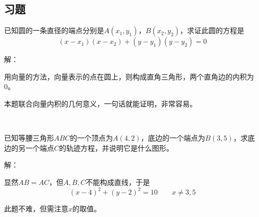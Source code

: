 \subsection{习题}

\begin{example}
已知圆的一条直径的端点分别是$A\left( x_1,y_1 \right) $，$B\left( x_2,y_2 \right) $，求证此圆的方程是
\[
\left( x-x_1 \right) \left( x-x_2 \right) +\left( y-y_1 \right) \left( y-y_2 \right) =0
\]
\end{example}

解：

用向量的方法，向量表示的点在圆上，则构成直角三角形，两个直角边的内积为0。

\begin{tcolorbox}
本题联合向量内积的几何意义，一句话就能证明，非常容易。
\end{tcolorbox}

~

\begin{example}
已知等腰三角形$ABC$的一个顶点为$A\left( 4,2 \right) $，底边的一个端点为$B\left( 3,5 \right) $，求底边的另一个端点$C$的轨迹方程，并说明它是什么图形。
\end{example}

解：

显然$AB=AC$，但$A,B,C$不能构成直线，于是
\[
\left( x-4 \right) ^2+\left( y-2 \right) ^2=10 \qquad x\ne 3,5
\]

\begin{tcolorbox}
此题不难，但需注意$x$的取值。
\end{tcolorbox}




